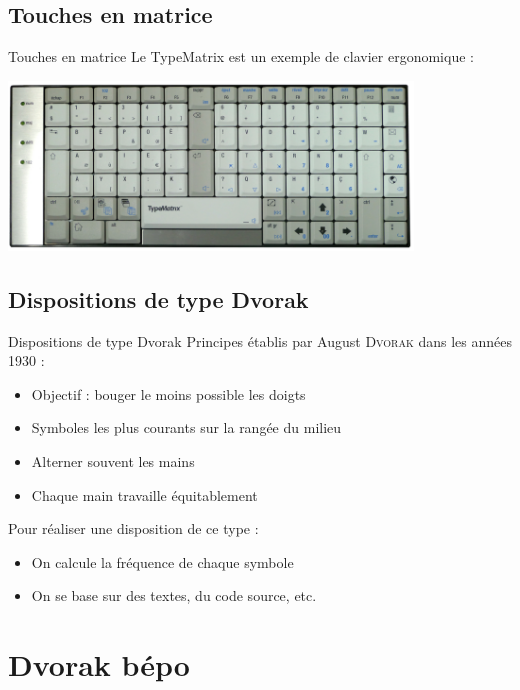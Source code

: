 \documentclass{beamer}
\begin{document}
\subsection{Touches en matrice}
\begin{frame}{Touches en matrice}
  Le TypeMatrix est un exemple de clavier ergonomique :
  \begin{center}
    \includegraphics[height=4.5cm]{typematrix.png}
  \end{center}
\end{frame}

\subsection{Dispositions de type Dvorak}
\begin{frame}{Dispositions de type Dvorak}
  Principes établis par August \textsc{Dvorak} dans les années 1930 :
  \begin{itemize}
    \item Objectif : bouger le moins possible les doigts
    \item Symboles les plus courants sur la rangée du milieu
    \item Alterner souvent les mains
    \item Chaque main travaille équitablement
  \end{itemize}
  
  \bigskip
  \pause
  Pour réaliser une disposition de ce type :
  \begin{itemize}
    \item On calcule la fréquence de chaque symbole
    \item On se base sur des textes, du code source, etc.
  \end{itemize}
\end{frame}


\section{Dvorak bépo}
\begin{frame}
  \tableofcontents[sectionstyle=show/shaded, hideothersubsections]
\end{frame}
\end{document}
